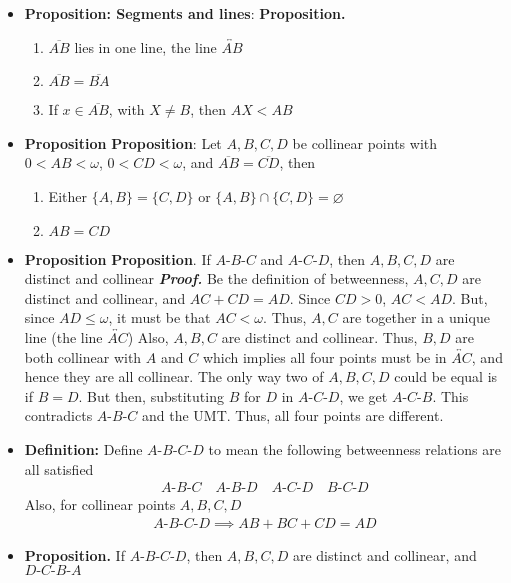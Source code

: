 \documentclass{report}
\begin{document}
\begin{itemize}
\begin{itemize}
        \end{itemize}
    \item \textbf{Proposition: Segments and lines}:
        \bigbreak \noindent 
        \textbf{Proposition.}
        \begin{enumerate}[label=(\alph*)]
            \item $\overline{AB}$ lies in one line, the line $\overleftrightarrow{AB} $
            \item $\overline{AB} = \overline{BA} $
            \item If $x\in \overline{AB}$, with $X \ne B$, then $AX < AB $
        \end{enumerate}
    \item \textbf{Proposition}
        \bigbreak \noindent 
        \textbf{Proposition}: Let $A,B,C,D$ be collinear points with $0 < AB < \omega$, $0< CD<\omega$, and $\overline{AB} = \overline{CD}$, then
        \begin{enumerate}[label=(\alph*)]
            \item Either $\{A,B\} = \{C,D\}$ or $\{A,B\} \cap \{C,D\} = \varnothing$
            \item $AB = CD$
        \end{enumerate}
    \item \textbf{Proposition}
        \bigbreak \noindent 
        \textbf{Proposition}. If $A\text{-}B\text{-}C$ and $A\text{-}C\text{-}D$, then $A,B,C,D$ are distinct and collinear 
        \bigbreak \noindent 
        \textbf{\textit{Proof.}} Be the definition of betweenness, $A,C,D$ are distinct and collinear, and $AC + CD = AD$. Since $CD > 0$, $AC < AD$. But, since $AD \leq \omega$, it must be that $AC < \omega$. Thus, $A,C$ are together in a unique line  (the line $\overleftrightarrow{AC} $)
        \bigbreak \noindent 
        Also, $A,B,C$ are distinct and collinear. Thus, $B,D$ are both collinear with $A$ and $C$ which implies all four points must be in $\overleftrightarrow{AC}$, and hence they are all collinear.
        \bigbreak \noindent 
        The only way two of $A,B,C,D$ could be equal is if $B =D$. But then, substituting $B$ for $D$ in $A\text{-}C\text{-}D$, we get $A\text{-}C\text{-}B$. This contradicts $A\text{-}B\text{-}C$ and the UMT. Thus, all four points are different. \endpf

    \item \textbf{Definition:} Define $A\text{-}B\text{-}C\text{-}D$ to mean the following betweenness relations are all satisfied
        \begin{align*}
            A\text{-}B\text{-}C \quad A\text{-}B\text{-}D \quad A\text{-}C\text{-}D \quad B\text{-}C\text{-}D 
        \end{align*}
        \bigbreak \noindent 
        Also, for collinear points $A,B,C,D$
        \begin{align*}
            A\text{-}B\text{-}C\text{-}D \implies AB + BC + CD = AD
        \end{align*}
    \item \textbf{Proposition.} If $A\text{-}B\text{-}C\text{-}D$, then $A,B,C,D$ are distinct and collinear, and $D\text{-}C\text{-}B\text{-}A $
        \bigbreak \noindent 


\end{itemize}
\end{document}
